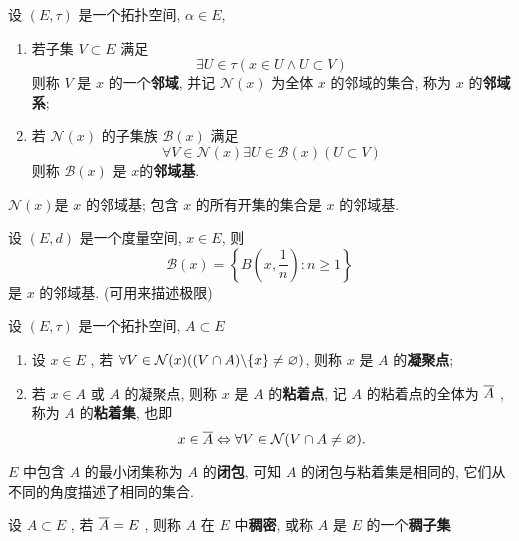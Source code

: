 \begin{Def}[邻域基]\label{def:邻域基}
       设 $ (E, \tau) $ 是一个拓扑空间, $ \alpha\in E $, 
       \begin{enumerate}[(1)]
            \item 若子集 $ V\subset E $ 满足
            \[
                 \exists U\in \tau(x\in U\wedge U\subset V)
            \]
            则称 $ V $ 是 $ x $ 的一个\textbf{邻域}, 并记 $ \mathcal{N}(x) $ 为全体 $ x $ 的邻域的集合, 称为 $ x $ 的\textbf{邻域系};
            \item 若 $ \mathcal{N}(x) $ 的子集族 $ \mathcal{B}(x) $ 满足
            \[
                 \forall V\in \mathcal{N}(x)\exists U\in \mathcal{B}(x)(U\subset V)
            \]  
            则称 $ \mathcal{B}(x) $ 是 $ x $的\textbf{邻域基}. 
       \end{enumerate}
 \end{Def}
 \begin{Rmk}
      $ \mathcal{N}(x) $是 $ x $  的邻域基; 包含 $ x $ 的所有开集的集合是 $ x $ 的邻域基. 
 \end{Rmk}
 \begin{Ex}
      设 $ (E, d) $ 是一个度量空间, $ x\in E $, 则 
      \[
          \mathcal{B}(x)=\left\{ B(x,\frac{1}{n}): n\geqslant 1 \right\} 
      \]
      是 $ x $ 的邻域基. (可用来描述极限)
 \end{Ex}
 \begin{Def}[粘着集]
     设 $ (E, \tau) $ 是一个拓扑空间, $ A\subset E $ 
     \begin{enumerate}[(1)]
          \item 设 $ x\in E $ , 若 $ \forall V\in \mathcal{N}(x)((V\cap A)\bs \{ x \}\neq\varnothing) $, 则称 $ x $ 是 $ A $ 的\textbf{凝聚点};
          \item 若 $ x\in A $ 或 $ A $  的凝聚点, 则称 $ x $ 是 $ A $ 的\textbf{粘着点}, 记 $ A $ 的粘着点的全体为 $ \baro{A} $ , 称为 $ A $ 的\textbf{粘着集}, 也即
          \[
               x\in \baro{A}\Leftrightarrow \forall V\in \mathcal{N}(V\cap A\neq\varnothing).    
          \]
     \end{enumerate}
 \end{Def}
 \begin{Rmk}
      $ E $ 中包含 $ A $ 的最小闭集称为 $ A $ 的\textbf{闭包}, 可知 $ A $ 的闭包与粘着集是相同的, 它们从不同的角度描述了相同的集合. 
 \end{Rmk}
 \begin{Def}[稠密]\label{def:稠密}
       设 $ A\subset E $ , 若 $ \baro{A}=E $ , 则称 $ A $ 在 $ E $ 中\textbf{稠密}, 或称 $ A $ 是 $ E $ 的一个\textbf{稠子集}
 \end{Def}
